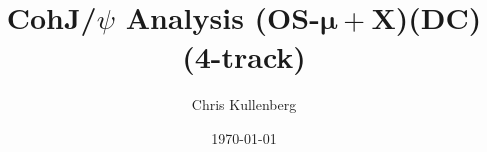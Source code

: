 \title{CohJ/$\psi$ Analysis (\textbf{OS}-$\boldsymbol{\mu+}$\textbf{X})(\textbf{DC})(\textbf{4-track})}
\author{Chris Kullenberg}
\date{\today}

